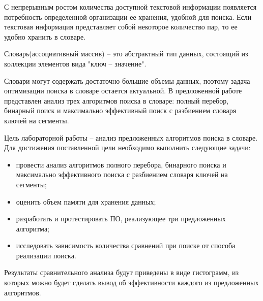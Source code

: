 \setcounter{page}{2}

С непрерывным ростом количества доступной текстовой информации появляется потребность определенной организации ее хранения, удобной для поиска. Если текстовая информация представляет собой некоторое количество пар, то ее удобно хранить в словаре. 

Словарь(ассоциативный массив) -- это абстрактный тип данных, состоящий из коллекции элементов вида "ключ -- значение".  

Словари могут содержать достаточно большие объемы данных, поэтому задача оптимизации поиска в словаре остается актуальной. В предложенной работе представлен анализ трех алгоритмов поиска в словаре: полный перебор, бинарный поиск и максимально эффективный поиск с разбиением словаря ключей на сегменты.

Цель лабораторной работы -- анализ предложенных алгоритмов поиска в словаре. Для достижения поставленной цели необходимо выполнить следующие задачи:
\begin{itemize}
	\item провести анализ алгоритмов полного перебора, бинарного поиска и максимально эффективного поиска с разбиением словаря ключей на сегменты;
	\item оценить объем памяти для хранения данных;
	\item разработать и протестировать ПО, реализующее три предложенных алгоритма;
	\item исследовать зависимость количества сравнений при поиске от способа реализации поиска.
\end{itemize}
Результаты сравнительного анализа будут приведены в виде гистограмм, из которых можно будет сделать вывод об эффективности каждого из предложенных алгоритмов.